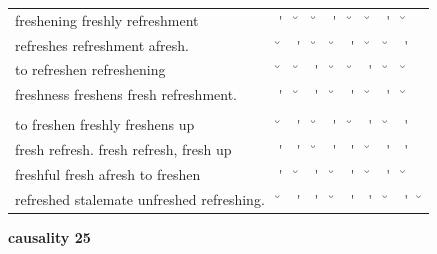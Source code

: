 \documentclass[12pt, landscape]{article}
\begin{document}
\begin{center}
\begin{tabularx}{\textwidth}{
>{\lefting\arraybackslash}X
c
c
c
c
c
c
c
c
c
}

freshening freshly refreshment & \'{} & \u{} & \u{} & \'{} & \u{} & \u{} & \'{} & \u{} & \\
refreshes refreshment afresh. & \u{} & \'{} & \u{} & \u{} & \'{} & \u{} & \u{} & \'{} & \\
to refreshen refreshening & \u{} & \u{} & \'{} & \u{} & \u{} & \'{} & \u{} & \u{} & \\
freshness freshens fresh refreshment. & \'{} & \u{} & \'{} & \u{} & \'{} & \u{} & \'{} & \u{} & \\
 & & & & & & & & \\
to freshen freshly freshens up & \u{} & \'{} & \u{} & \'{} & \u{} & \'{} & \u{} & \'{} & \\
fresh refresh. fresh refresh, fresh up & \'{} & \'{} & \u{} & \'{} & \'{} & \u{} & \'{} & \'{} & \\
freshful fresh afresh to freshen & \'{} & \u{} & \'{} & \u{} & \'{} & \u{} & \'{} & \u{} & \\
refreshed stalemate unfreshed refreshing. & \u{} & \'{} & \'{} & \u{} & \'{} & \'{} & \u{} & \'{} & \u{} \\

\end{tabularx}
\end{center}

\vspace*{\fill}

\newpage

\vspace*{\fill}

\noindent \textbf{causality 25}
\noindent \hfill \par
\end{document}
